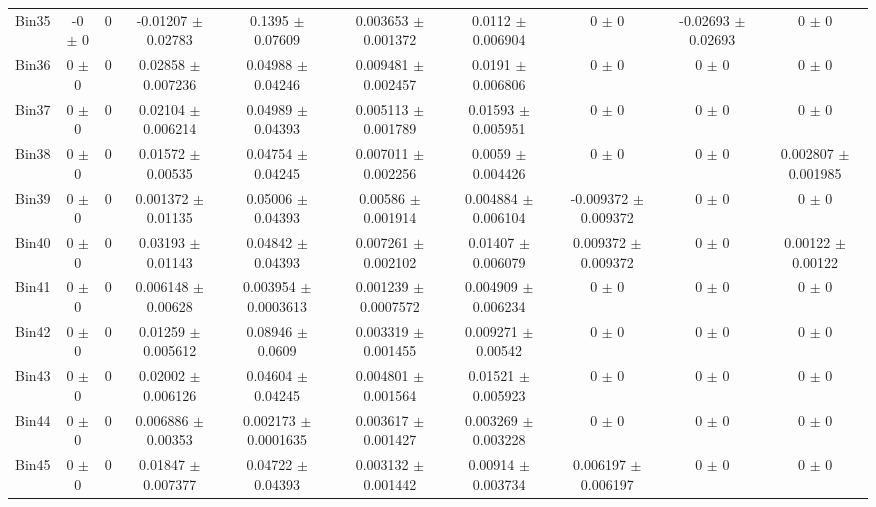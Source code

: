 \begin{tabular}{@{\extracolsep{4pt}}lccccccccc@{}}
     Bin35 & -0 $\pm$ 0 & 0 & -0.01207 $\pm$ 0.02783 & 0.1395 $\pm$ 0.07609 & 0.003653 $\pm$ 0.001372 & 0.0112 $\pm$ 0.006904 & 0 $\pm$ 0 & -0.02693 $\pm$ 0.02693 & 0 $\pm$ 0 \\ 
     Bin36 & 0 $\pm$ 0 & 0 & 0.02858 $\pm$ 0.007236 & 0.04988 $\pm$ 0.04246 & 0.009481 $\pm$ 0.002457 & 0.0191 $\pm$ 0.006806 & 0 $\pm$ 0 & 0 $\pm$ 0 & 0 $\pm$ 0 \\ 
     Bin37 & 0 $\pm$ 0 & 0 & 0.02104 $\pm$ 0.006214 & 0.04989 $\pm$ 0.04393 & 0.005113 $\pm$ 0.001789 & 0.01593 $\pm$ 0.005951 & 0 $\pm$ 0 & 0 $\pm$ 0 & 0 $\pm$ 0 \\ 
     Bin38 & 0 $\pm$ 0 & 0 & 0.01572 $\pm$ 0.00535 & 0.04754 $\pm$ 0.04245 & 0.007011 $\pm$ 0.002256 & 0.0059 $\pm$ 0.004426 & 0 $\pm$ 0 & 0 $\pm$ 0 & 0.002807 $\pm$ 0.001985 \\ 
     Bin39 & 0 $\pm$ 0 & 0 & 0.001372 $\pm$ 0.01135 & 0.05006 $\pm$ 0.04393 & 0.00586 $\pm$ 0.001914 & 0.004884 $\pm$ 0.006104 & -0.009372 $\pm$ 0.009372 & 0 $\pm$ 0 & 0 $\pm$ 0 \\ 
     Bin40 & 0 $\pm$ 0 & 0 & 0.03193 $\pm$ 0.01143 & 0.04842 $\pm$ 0.04393 & 0.007261 $\pm$ 0.002102 & 0.01407 $\pm$ 0.006079 & 0.009372 $\pm$ 0.009372 & 0 $\pm$ 0 & 0.00122 $\pm$ 0.00122 \\ 
     Bin41 & 0 $\pm$ 0 & 0 & 0.006148 $\pm$ 0.00628 & 0.003954 $\pm$ 0.0003613 & 0.001239 $\pm$ 0.0007572 & 0.004909 $\pm$ 0.006234 & 0 $\pm$ 0 & 0 $\pm$ 0 & 0 $\pm$ 0 \\ 
     Bin42 & 0 $\pm$ 0 & 0 & 0.01259 $\pm$ 0.005612 & 0.08946 $\pm$ 0.0609 & 0.003319 $\pm$ 0.001455 & 0.009271 $\pm$ 0.00542 & 0 $\pm$ 0 & 0 $\pm$ 0 & 0 $\pm$ 0 \\ 
     Bin43 & 0 $\pm$ 0 & 0 & 0.02002 $\pm$ 0.006126 & 0.04604 $\pm$ 0.04245 & 0.004801 $\pm$ 0.001564 & 0.01521 $\pm$ 0.005923 & 0 $\pm$ 0 & 0 $\pm$ 0 & 0 $\pm$ 0 \\ 
     Bin44 & 0 $\pm$ 0 & 0 & 0.006886 $\pm$ 0.00353 & 0.002173 $\pm$ 0.0001635 & 0.003617 $\pm$ 0.001427 & 0.003269 $\pm$ 0.003228 & 0 $\pm$ 0 & 0 $\pm$ 0 & 0 $\pm$ 0 \\ 
     Bin45 & 0 $\pm$ 0 & 0 & 0.01847 $\pm$ 0.007377 & 0.04722 $\pm$ 0.04393 & 0.003132 $\pm$ 0.001442 & 0.00914 $\pm$ 0.003734 & 0.006197 $\pm$ 0.006197 & 0 $\pm$ 0 & 0 $\pm$ 0 \\ 
\hline\hline
  \end{tabular}
